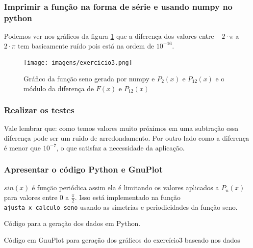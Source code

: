 \newpage
\subsubsection{Imprimir a função na forma de série e usando numpy no python}

Podemos ver nos gráficos da figura \ref{fig:grafico_exe3} que a diferença dos valores entre $-2 \cdot \pi$ a $2 \cdot \pi$ tem basicamente ruído pois está na ordem de $10^{-16}$.
\begin{figure}[H]
    \centering
    \texttt{[image: imagens/exercicio3.png]}
    \caption{Gráfico da função seno gerada por numpy e $P_2(x)$ e $P_{12}(x)$ e o módulo da diferença de $F(x)$ e $P_{12}(x)$}
    \label{fig:grafico_exe3}
\end{figure}

\newpage

\subsubsection{Realizar os testes}



Vale lembrar que: como temos valores muito próximos em uma subtração essa diferença pode ser um ruido de arredondamento.
Por outro lado como a diferença é menor que $10^{-7}$, o que satisfaz a necessidade da aplicação.\\

\subsubsection{Apresentar o código Python e GnuPlot}
\label{sec:caracteristicas-funcao-sin}
$sin(x)$ é função periódica assim ela é limitando os valores aplicados a $P_{n}(x)$ para valores entre $0$ a $\frac{\pi}{2}$.
Isso está implementado na função \texttt{ajusta\_x\_calculo\_seno} usando as simetrias e periodicidades da função seno.


Código para a geração dos dados em Python.

\newpage

Código em GnuPlot para geração dos gráficos do exercício3 baseado nos dados


\newpage





